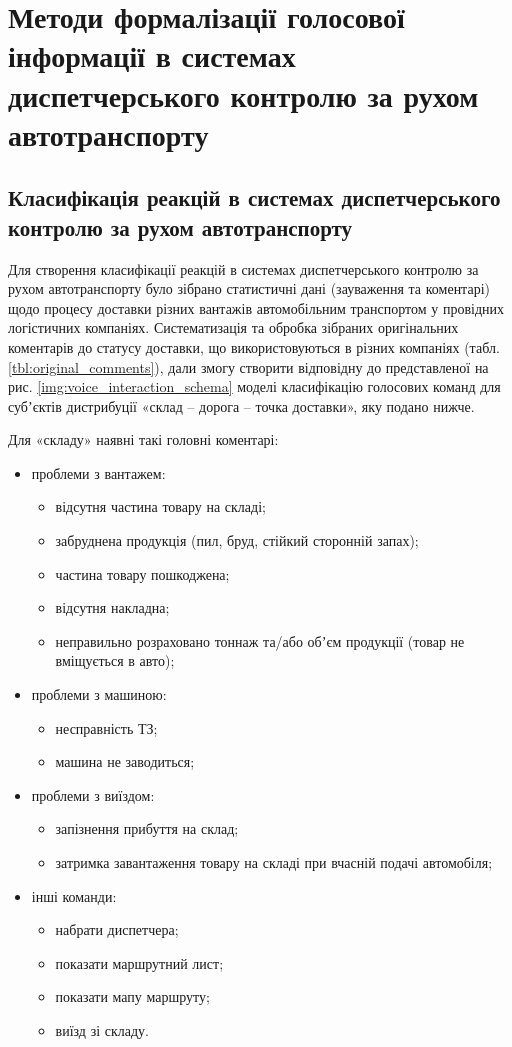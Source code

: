 \chapter{Методи формалізації голосової інформації в системах диспетчерського контролю за рухом автотранспорту} \label{chapt3}

\section{Класифікація реакцій в системах диспетчерського контролю за рухом автотранспорту} \label{sect3_1}

Для створення класифікації реакцій в системах диспетчерського контролю за рухом автотранспорту було зібрано статистичні дані (зауваження та коментарі) щодо процесу доставки різних вантажів автомобільним транспортом у провідних логістичних компаніях. Систематизація та обробка зібраних оригінальних коментарів до статусу доставки, що використовуються в різних компаніях (табл. \ref{tbl:original_comments}), дали змогу створити відповідну до представленої на рис. \ref{img:voice_interaction_schema} моделі класифікацію голосових команд для субʼєктів дистрибуції «склад – дорога – точка доставки», яку подано нижче.

Для «складу» наявні такі головні коментарі:
\begin{itemize}
	\item проблеми з вантажем:
	\begin{itemize}
		\item відсутня частина товару на складі;
		\item забруднена продукція (пил, бруд, стійкий сторонній запах);
		\item частина товару пошкоджена;
		\item відсутня накладна;
		\item неправильно розраховано тоннаж та/або обʼєм продукції (товар не вміщується в авто);
	\end{itemize}
	\item проблеми з машиною:
	\begin{itemize}
		\item несправність ТЗ;
		\item машина не заводиться;
	\end{itemize}
	\item проблеми з виїздом:
	\begin{itemize}
		\item запізнення прибуття на склад;
		\item затримка завантаження товару на складі при вчасній подачі автомобіля;
	\end{itemize}
	\item інші команди:
	\begin{itemize}
		\item набрати диспетчера;
		\item показати маршрутний лист;
		\item показати мапу маршруту;
		\item виїзд зі складу.
	\end{itemize}
\end{itemize}

